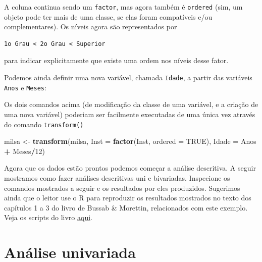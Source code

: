 \documentclass[10pt,a4paper]{book}
\newenvironment{Shaded}{\begin{snugshade}}{\end{snugshade}}
\newcommand{\KeywordTok}[1]{\textcolor[rgb]{0.13,0.29,0.53}{\textbf{#1}}}
\newcommand{\DataTypeTok}[1]{\textcolor[rgb]{0.13,0.29,0.53}{#1}}
\newcommand{\DecValTok}[1]{\textcolor[rgb]{0.00,0.00,0.81}{#1}}
\newcommand{\StringTok}[1]{\textcolor[rgb]{0.31,0.60,0.02}{#1}}
\newcommand{\OtherTok}[1]{\textcolor[rgb]{0.56,0.35,0.01}{#1}}
\newcommand{\OperatorTok}[1]{\textcolor[rgb]{0.81,0.36,0.00}{\textbf{#1}}}
\newcommand{\NormalTok}[1]{#1}
\begin{document}
A coluna continua sendo um \texttt{factor}, mas agora também é
\texttt{ordered} (sim, um objeto pode ter mais de uma classe, se elas
foram compatíveis e/ou complementares). Os níveis agora são
representados por

\begin{verbatim}
1o Grau < 2o Grau < Superior
\end{verbatim}

para indicar explicitamente que existe uma ordem nos níveis desse fator.

Podemos ainda definir uma nova variável, chamada \texttt{Idade}, a
partir das variáveis \texttt{Anos} e \texttt{Meses}:

\begin{Shaded}
\end{Shaded}

Os dois comandos acima (de modificação da classe de uma variável, e a
criação de uma nova variável) poderiam ser facilmente executadas de uma
única vez através do comando \texttt{transform()}

\begin{Shaded}
\begin{Highlighting}[]
\NormalTok{milsa <-}\StringTok{ }\KeywordTok{transform}\NormalTok{(milsa,}
                   \DataTypeTok{Inst =} \KeywordTok{factor}\NormalTok{(Inst, }\DataTypeTok{ordered =} \OtherTok{TRUE}\NormalTok{),}
                   \DataTypeTok{Idade =}\NormalTok{ Anos }\OperatorTok{+}\StringTok{ }\NormalTok{Meses}\OperatorTok{/}\DecValTok{12}\NormalTok{)}
\end{Highlighting}
\end{Shaded}

Agora que os dados estão prontos podemos começar a análise descritiva. A
seguir mostramos como fazer análises descritivas uni e bivariadas.
Inspecione os comandos mostrados a seguir e os resultados por eles
produzidos. Sugerimos ainda que o leitor use o R para reproduzir os
resultados mostrados no texto dos capítulos 1 a 3 do livro de Bussab \&
Morettin, relacionados com este exemplo. Veja os scripts do livro
\href{https://rpubs.com/EstatBasica/Introd}{aqui}.

\section{Análise univariada}\label{anuxe1lise-univariada}
\end{document}
